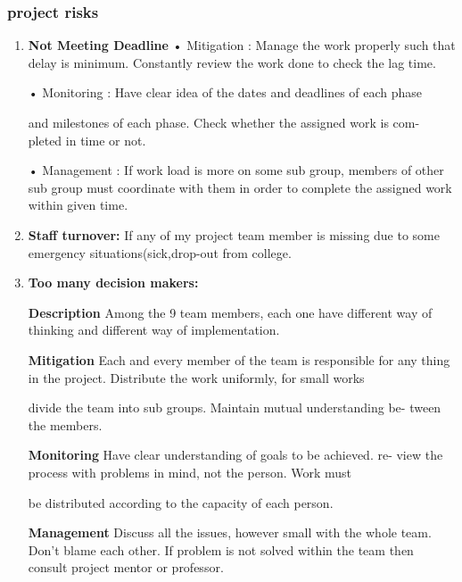 \documentclass[12pt]{article}
\begin{document}
\subsubsection{project risks}
\begin{enumerate}
    \item 
    \textbf{Not Meeting Deadline}
• Mitigation : Manage the work properly such that delay is minimum.
Constantly review the work done to check the lag time.

• Monitoring : Have clear idea of the dates and deadlines of each phase

and milestones of each phase. Check whether the assigned work is com-
pleted in time or not.

• Management : If work load is more on some sub group, members of
other sub group must coordinate with them in order to complete the
assigned work within given time.
    \item 
    \textbf{Staff turnover:} If any of my project team member is missing due to
some emergency situations(sick,drop-out from college.
\item 
\textbf{Too many decision makers:} 

\bigskip
\textbf{Description}
Among the 9 team members, each one
have different way of thinking and different way of implementation.

\bigskip
\textbf{Mitigation}
Each and every member of the team is responsible for
any thing in the project. Distribute the work uniformly, for small works

divide the team into sub groups. Maintain mutual understanding be-
tween the members.


\bigskip
\textbf{Monitoring}
Have clear understanding of goals to be achieved. re-
view the process with problems in mind, not the person. Work must

be distributed according to the capacity of each person.

\bigskip
\textbf{Management}
Discuss all the issues, however small with the whole
team. Don’t blame each other. If problem is not solved within the
team then consult project mentor or professor.


\end{enumerate}
\end{document}
